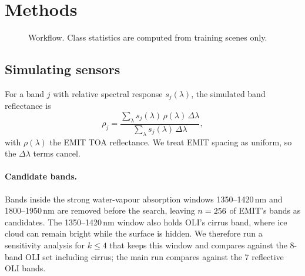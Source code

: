 \documentclass[11pt]{article}
\newcommand{\nm}{\,nm}
\begin{document}
\section{Methods}

\begin{figure}[t]
\centering
{}
\caption{Workflow. Class statistics are computed from training scenes only.}
\label{fig:workflow}
\end{figure}

\subsection{Simulating sensors}

For a band $j$ with relative spectral response $s_j(\lambda)$, the simulated
band reflectance is
\begin{equation}
  \rho_j = \frac{\sum_\lambda s_j(\lambda)\,\rho(\lambda)\,\Delta\lambda}
                {\sum_\lambda s_j(\lambda)\,\Delta\lambda},
  \label{eq:simulate}
\end{equation}
with $\rho(\lambda)$ the EMIT TOA reflectance. We treat EMIT spacing as
uniform, so the $\Delta\lambda$ terms cancel.

\paragraph{Candidate bands.}\label{sec:candidates} Bands inside the strong water-vapour absorption
windows 1350--1420\nm{} and 1800--1950\nm{} are removed before the search,
leaving $n = 256$ of EMIT's \nBandsEMIT{} bands as candidates. The 1350--1420\nm{} window also holds OLI's
cirrus band, where ice cloud can remain bright while the surface is hidden. We
therefore run a sensitivity analysis for $k \le 4$ that keeps this window and
compares against the 8-band OLI set including cirrus; the main run compares
against the 7 reflective OLI bands.
\end{document}
